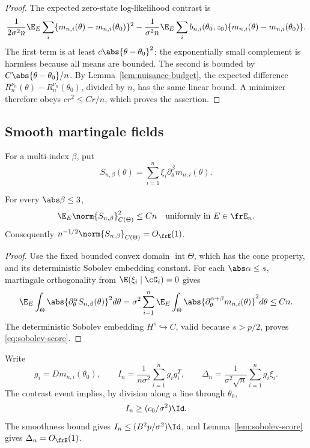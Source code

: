\begin{proof}
The expected zero-state log-likelihood contrast is
\[
 \frac1{2\sigma^2n}\E_E\sum_i
 \{m_{n,i}(\theta)-m_{n,i}(\theta_0)\}^2
 -\frac1{\sigma^2n}\E_E\sum_i
 b_{n,i}(\theta_0,z_0)
 \{m_{n,i}(\theta)-m_{n,i}(\theta_0)\}.
\]
The first term is at least \(c\abs{\theta-\theta_0}^2\); the exponentially
small complement is harmless because all means are bounded.  The second is
bounded by \(C\abs{\theta-\theta_0}/n\).  By
Lemma~\ref{lem:nuisance-budget}, the expected difference
\(R_n^{\nu_n}(\theta)-R_n^{\nu_n}(\theta_0)\), divided by \(n\), has the same
linear bound.  A minimizer therefore obeys
\(c r^2\le Cr/n\), which proves the assertion.
\end{proof}

\subsection{Smooth martingale fields}

For a multi-index \(\beta\), put
\[
 S_{n,\beta}(\theta)=\sum_{i=1}^n
 \xi_i\partial_\theta^\beta m_{n,i}(\theta).
\]

\begin{lemma}
\label{lem:sobolev-score}
For every \(\abs\beta\le3\),
\begin{equation}
 \E_E\norm{S_{n,\beta}}_{C(\Theta)}^2\le Cn
 \quad\hbox{uniformly in }E\in\frE_n.
 \label{eq:sobolev-score}
\end{equation}
Consequently \(n^{-1/2}\norm{S_{n,\beta}}_{C(\Theta)}=O_{\frE}(1)\).
\end{lemma}

\begin{proof}
Use the fixed bounded convex domain \(\operatorname{int}\Theta\), which has
the cone property, and its deterministic Sobolev embedding constant.
For each \(\abs\alpha\le s\), martingale orthogonality from
\(\E(\xi_i\mid\cG_i)=0\) gives
\[
 \E_E\int_\Theta
 \abs{\partial_\theta^\alpha S_{n,\beta}(\theta)}^2d\theta
 =\sigma^2\sum_{i=1}^n\E_E\int_\Theta
 \abs{\partial_\theta^{\alpha+\beta}m_{n,i}(\theta)}^2d\theta
 \le Cn.
\]
The deterministic Sobolev embedding \(H^s\hookrightarrow C\), valid because
\(s>p/2\), proves \eqref{eq:sobolev-score}.
\end{proof}

Write
\[
 g_i=Dm_{n,i}(\theta_0),\qquad
 I_n=\frac1{n\sigma^2}\sum_{i=1}^ng_ig_i^T,\qquad
 \Delta_n=\frac1{\sigma^2\sqrt n}\sum_{i=1}^ng_i\xi_i.
\]
The contrast event implies, by division along a line through \(\theta_0\),
\[
 I_n\ge(c_0/\sigma^2)\Id.
\]
The smoothness bound gives \(I_n\le(B^2p/\sigma^2)\Id\), and
Lemma~\ref{lem:sobolev-score} gives \(\Delta_n=O_{\frE}(1)\).

